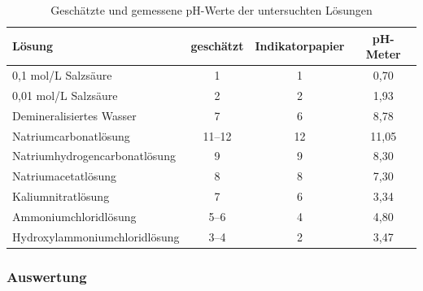 \begin{table}[H]
    \centering
    \caption{Geschätzte und gemessene pH-Werte der untersuchten Lösungen}
    \label{tab:ph_werte_versuch1}
    \begin{tabular}{|l|c|c|c|}
        \hline
        \textbf{Lösung}               & \textbf{geschätzt} & \textbf{Indikatorpapier} & \textbf{pH-Meter} \\
        \hline
        0,1 mol/L Salzsäure           & 1                  & 1                        & 0,70              \\
        0,01 mol/L Salzsäure          & 2                  & 2                        & 1,93              \\
        Demineralisiertes Wasser      & 7                  & 6                        & 8,78              \\
        Natriumcarbonatlösung         & 11--12             & 12                       & 11,05             \\
        Natriumhydrogencarbonatlösung & 9                  & 9                        & 8,30              \\
        Natriumacetatlösung           & 8                  & 8                        & 7,30              \\
        Kaliumnitratlösung            & 7                  & 6                        & 3,34              \\
        Ammoniumchloridlösung         & 5--6               & 4                        & 4,80              \\
        Hydroxylammoniumchloridlösung & 3--4               & 2                        & 3,47              \\
        \hline
    \end{tabular}
\end{table}

\subsubsection{Auswertung}


